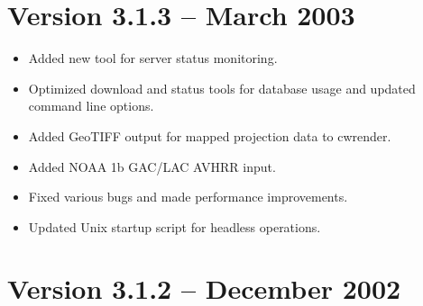 
\section{Version 3.1.3 -- March 2003}

\begin{itemize}

  \item Added new tool for server status monitoring.

  \item Optimized download and status tools for database usage and
  updated command line options.

  \item Added GeoTIFF output for mapped projection data to cwrender.

  \item Added NOAA 1b GAC/LAC AVHRR input.

  \item Fixed various bugs and made performance improvements.

  \item Updated Unix startup script for headless operations.

\end{itemize}


\section{Version 3.1.2 -- December 2002}

